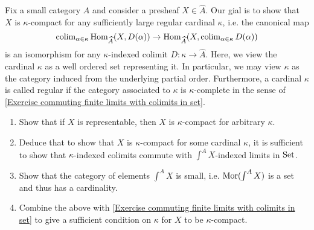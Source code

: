 \begin{Exercise}
    Fix a small category $ A $ and consider a presheaf $ X \in \widehat{A}$.
    Our gial is to show that $ X $ is $ \kappa$-compact for any sufficiently large regular cardinal $ \kappa $, i.e. the canonical map 
    \[
        \operatorname{colim}_{ \alpha \in \kappa } \operatorname{Hom}_{ \widehat{A}} ( X , D ( \alpha ) ) \to \operatorname{Hom}_{\widehat{ A }} ( X , \operatorname{colim}_{ \alpha \in \kappa } D ( \alpha ) )
    \]
    is an isomorphism for any $ \kappa $-indexed colimit $ D : \kappa \to \widehat{ A } $.
    Here, we view the cardinal $ \kappa $ as a well ordered set representing it.
    In particular, we may view $ \kappa $ as the category induced from the underlying partial order.
    Furthermore, a cardinal $ \kappa $ is called regular if the category associated to $ \kappa $ is $ \kappa $-complete in the sense of \cref{Exercise commuting finite limits with colimits in set}.
    \begin{enumerate}[label=(\alph*)]
        \item 
        Show that if $ X $ is representable, then $ X $ is $ \kappa $-compact for arbitrary $ \kappa $.

        \item 
        Deduce that to show that $ X $ is $ \kappa $-compact for some cardinal $ \kappa $, it is sufficient to show that $ \kappa$-indexed colimits commute with $ \int^A X $-indexed limits in $\operatorname{Set}$.

        \item 
        Show that the category of elements $ \int^A X $ is small, i.e. $ \operatorname{Mor} ( \int^A X ) $ is a set and thus has a cardinality.

        \item 
        Combine the above with \cref{Exercise commuting finite limits with colimits in set} to give a sufficient condition on $\kappa $ for $ X $ to be $ \kappa $-compact.
    \end{enumerate}
\end{Exercise}

